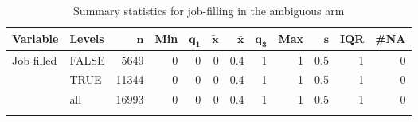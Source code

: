 \begingroup\footnotesize
\begin{longtable}{llrrrrrrrrrr}
\caption{Summary statistics for job-filling in the ambiguous arm} \\ 
 \textbf{Variable} & \textbf{Levels} & $\mathbf{n}$ & \textbf{Min} & $\mathbf{q_1}$ & $\mathbf{\widetilde{x}}$ & $\mathbf{\bar{x}}$ & $\mathbf{q_3}$ & \textbf{Max} & $\mathbf{s}$ & \textbf{IQR} & \textbf{\#NA} \\ 
  \hline
Job filled & FALSE &  5649 & 0 & 0 & 0 & 0.4 & 1 & 1 & 0.5 & 1 & 0 \\ 
   & TRUE & 11344 & 0 & 0 & 0 & 0.4 & 1 & 1 & 0.5 & 1 & 0 \\ 
   \hline
 & all & 16993 & 0 & 0 & 0 & 0.4 & 1 & 1 & 0.5 & 1 & 0 \\ 
   \hline
\hline
\label{}
\end{longtable}
\endgroup
